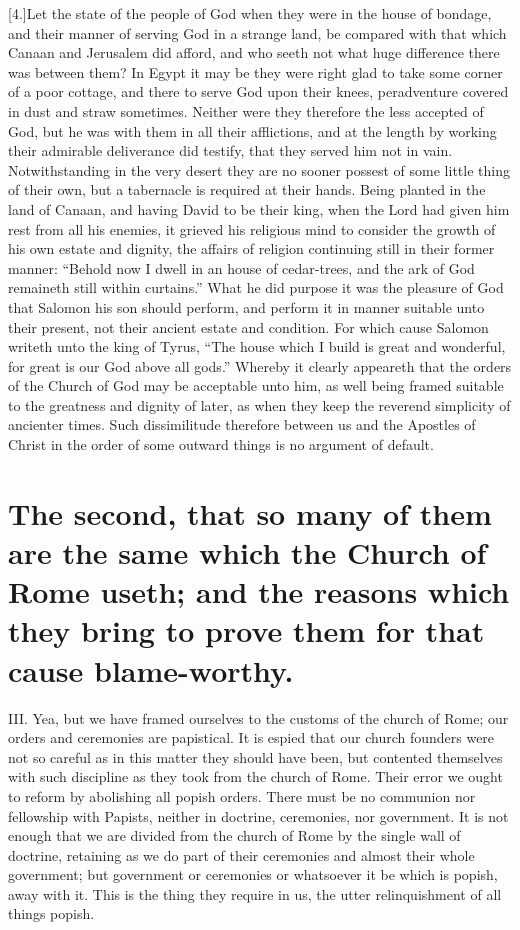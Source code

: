 [4.]Let the state of the people of God when they were in the house of bondage, and their manner of serving God in a strange land, be compared with that which Canaan and Jerusalem did afford, and who seeth not what huge difference there was between them? In Egypt it may be they were right glad to take some corner of a poor cottage, and there to serve God upon their knees, peradventure covered in dust and straw sometimes. Neither were they therefore the less accepted of God, but he was with them in all their afflictions, and at the length by working their admirable deliverance did testify, that they served him not in vain. Notwithstanding in the very desert they are no sooner possest of some little thing of their own, but a tabernacle is required at their hands. Being planted in the land of Canaan, and having David to be their king, when the Lord had given him rest from all his enemies, it grieved his religious mind to consider the growth of his own estate and dignity, the affairs of religion continuing  still in their former manner: “Behold now I dwell in an house of cedar-trees, and the ark of God remaineth still within curtains.” What he did purpose it was the pleasure of God that Salomon his son should perform, and perform it in manner suitable unto their present, not their ancient estate and condition. For which cause Salomon writeth unto the king of Tyrus, “The house which I build is great and wonderful, for great is our God above all gods.” Whereby it clearly appeareth that the orders of the Church of God may be acceptable unto him, as well being framed suitable to the greatness and dignity of later, as when they keep the reverend simplicity of ancienter times. Such dissimilitude therefore between us and the Apostles of Christ in the order of some outward things is no argument of default.

\section*{The second, that so many of them are the same which the Church of Rome useth; and the reasons which they bring to prove them for that cause blame-worthy.}

III. Yea, but we have framed ourselves to the customs of the church of Rome; our orders and ceremonies are papistical. It is espied that our church founders were not so careful as in this matter they should have been, but contented themselves with such discipline as they took from the church of Rome. Their error we ought to reform by abolishing all popish orders. There must be no communion nor fellowship with Papists, neither in doctrine, ceremonies, nor government. It is not enough that we are divided from the church of Rome by the single wall of doctrine, retaining as we do part of their ceremonies and almost their whole government; but government or ceremonies or whatsoever it be which is popish, away with it. This is the thing they require in us, the utter relinquishment of all things popish.

